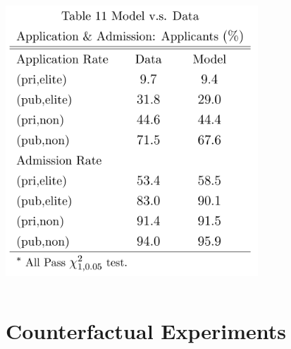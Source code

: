 \documentclass[10pt]{beamer}
\begin{document}
\begin{frame}[c]
\begin{columns}
\centerline{\includegraphics[width=0.8\textwidth]{table11.png}}
\end{columns}

\end{frame}


\section[Experiments]{Counterfactual Experiments}
\end{document}
